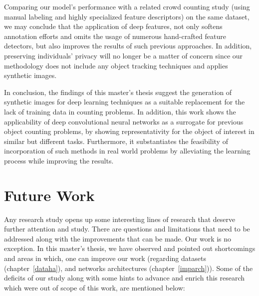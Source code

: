 Comparing our model's performance with a related crowd counting study (using manual labeling and highly specialized feature descriptors) on the same dataset, we may conclude that the application of deep features, not only softens annotation efforts and omits the usage of numerous hand-crafted feature detectors, but also improves the results of such previous approaches. In addition, preserving individuals' privacy will no longer be a matter of concern since our methodology does not include any object tracking techniques and applies synthetic images.    

\noindent In conclusion, the findings of this master's thesis suggest the generation of synthetic images for deep learning techniques as a suitable replacement for the lack of training data in counting problems. In addition, this work shows the applicability of deep convolutional neural networks as a surrogate for previous object counting problems, by showing representativity for the object of interest in similar but different tasks. Furthermore, it substantiates the feasibility of incorporation of such methods in real world problems by alleviating the learning process while improving the results.  


\section{Future Work}

Any research study opens up some interesting lines of research that deserve further attention and study. There are questions and limitations that need to be addressed along with the improvements that can be made. Our work is no exception. In this master's thesis, we have observed and pointed out shortcomings and areas in which, one can improve our work (regarding datasets (chapter~\ref{dataha}), and networks architectures (chapter~\ref{imparch})). Some of the deficits of our study along with some hints to advance and enrich this research which were out of scope of this work, are mentioned below:


